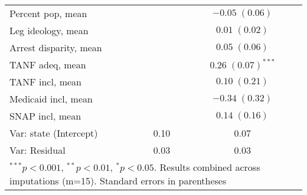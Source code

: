\begin{table}
\begin{center}
\begin{tabular}{l c c }
Percent pop, mean          &                         & $-0.05 \; (0.06)$      \\
Leg ideology, mean         &                         & $0.01 \; (0.02)$       \\
Arrest disparity, mean     &                         & $0.05 \; (0.06)$       \\
TANF adeq, mean            &                         & $0.26 \; (0.07)^{***}$ \\
TANF incl, mean            &                         & $0.10 \; (0.21)$       \\
Medicaid incl, mean        &                         & $-0.34 \; (0.32)$      \\
SNAP incl, mean            &                         & $0.14 \; (0.16)$       \\
\hline
Var: state (Intercept)     & 0.10                    & 0.07                   \\
Var: Residual              & 0.03                    & 0.03                   \\
\hline
\multicolumn{3}{l}{\scriptsize{$^{***}p<0.001$, $^{**}p<0.01$, $^*p<0.05$. Results combined across imputations (m=15). Standard errors in parentheses}}
\end{tabular}
\label{table:coefficients}
\end{center}
\end{table}
